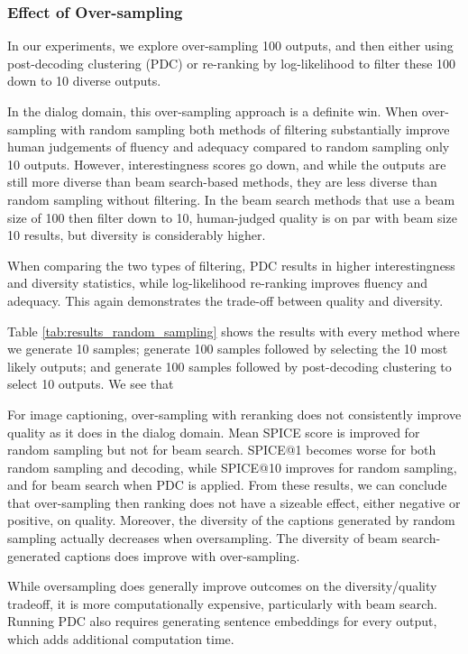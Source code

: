 \subsubsection{Effect of Over-sampling}

In our experiments, we explore over-sampling 100 outputs, and then either using post-decoding clustering (PDC) or re-ranking by log-likelihood to filter these 100 down to 10 diverse outputs.

In the dialog domain, this over-sampling approach is a definite win.
When over-sampling with random sampling both methods of filtering substantially improve human judgements of fluency and adequacy compared to random sampling only 10 outputs.
However, interestingness scores go down, and while the outputs are still more diverse than beam search-based methods, they are less diverse than random sampling without filtering.
In the beam search methods that use a beam size of 100 then filter down to 10, human-judged quality is on par with beam size 10 results, but diversity is considerably higher.

When comparing the two types of filtering, PDC results in higher interestingness and diversity statistics, while log-likelihood re-ranking improves fluency and adequacy.
This again demonstrates the trade-off between quality and diversity.

Table \ref{tab:results_random_sampling} shows the results with every method where we generate 10 samples; generate 100 samples followed by selecting the 10 most likely outputs; and generate 100 samples followed by post-decoding clustering to select 10 outputs.
We see that \TODO{}

For image captioning, over-sampling with reranking does not consistently improve quality as it does in the dialog domain.
Mean SPICE score is improved for random sampling but not for beam search. 
SPICE@1 becomes worse for both random sampling and decoding, while SPICE@10 improves for random sampling, and for beam search when PDC is applied.
From these results, we can conclude that over-sampling then ranking does not have a sizeable effect, either negative or positive, on quality.
Moreover, the diversity of the captions generated by random sampling actually decreases when oversampling. The diversity of beam search-generated captions does improve with over-sampling.

While oversampling does generally improve outcomes on the diversity/quality tradeoff, it is more computationally expensive, particularly with beam search.
Running PDC also requires generating sentence embeddings for every output, which adds additional computation time.



